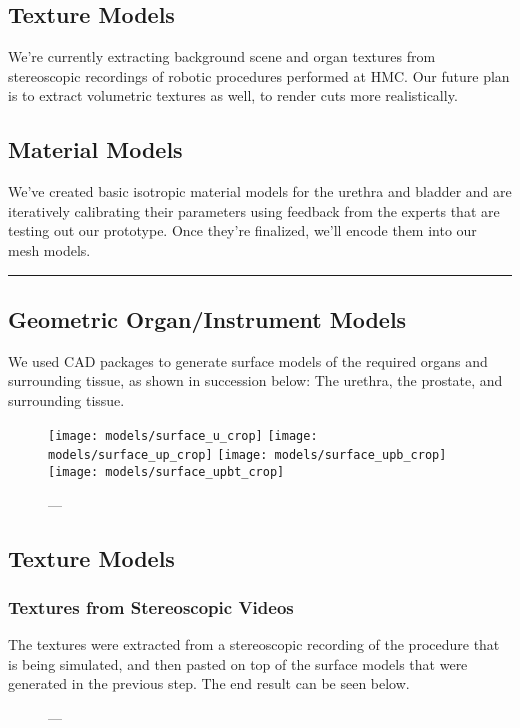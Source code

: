 \subsection{Texture Models}
We're currently extracting background scene and organ textures from stereoscopic recordings of robotic procedures performed at HMC. Our future plan is to extract volumetric textures as well, to render cuts more realistically.

\subsection{Material Models}
We've created basic isotropic material models for the urethra and bladder and are iteratively calibrating their parameters using feedback from the experts that are testing out our prototype. Once they're finalized, we'll encode them into our mesh models.

\hrule%

\subsection{Geometric Organ/Instrument Models}
We used CAD packages to generate surface models of the required organs and surrounding tissue, as shown in succession below: The urethra, the prostate, and surrounding tissue.

\begin{figure}
  \centering%
  \texttt{[image: models/surface\_u\_crop]}\hfill%
  \texttt{[image: models/surface\_up\_crop]}\hfill%
  \texttt{[image: models/surface\_upb\_crop]}\hfill%
  \texttt{[image: models/surface\_upbt\_crop]}
  \caption{---}\label{fig:surface_meshes}
\end{figure}

\subsection{Texture Models}

\subsubsection{Textures from Stereoscopic Videos}\label{sssec:videos}
The textures were extracted from a stereoscopic recording of the procedure that is being simulated, and then pasted on top of the surface models that were generated in the previous step. The end result can be seen below.

\begin{figure}
  \centering%
  \setlength{\fboxsep}{0pt}%
  \setlength{\fboxrule}{0.1pt}%
  \hfill%
  \caption{---}\label{fig:texture_videos}
\end{figure}

